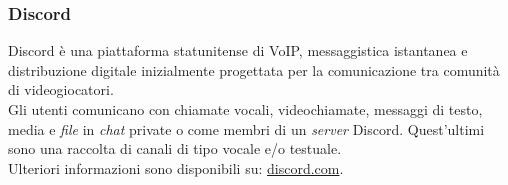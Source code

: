 \subsubsection*{Discord}
Discord è una piattaforma statunitense di VoIP, messaggistica istantanea e
distribuzione digitale inizialmente progettata per la comunicazione tra comunità
di videogiocatori.\\
Gli utenti comunicano con chiamate vocali, videochiamate, messaggi di testo,
media e \textit{file} in \textit{chat} private o come membri di un \textit{server}
Discord. Quest'ultimi sono una raccolta di canali di tipo vocale e/o testuale.\\
Ulteriori informazioni sono disponibili su:
\href{https://discord.com/}{discord.com}.

\newpage
